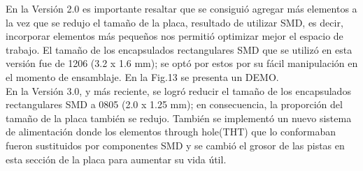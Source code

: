 \documentclass[times, 10pt,twocolumn]{article}
\begin{document}
En la Versión 2.0 es importante resaltar que se consiguió agregar más elementos a la vez que se redujo el tamaño de la placa, resultado de utilizar SMD, es decir, incorporar elementos más pequeños nos permitió optimizar mejor el espacio de trabajo. El tamaño de los encapsulados rectangulares SMD que se utilizó en esta versión fue de 1206 (3.2 x 1.6
mm); se optó por estos por su fácil manipulación en el momento de ensamblaje. En la Fig.13 se presenta un DEMO.\\

En la Versión 3.0, y más reciente, se logró reducir el tamaño de los encapsulados rectangulares SMD a 0805 (2.0 x 1.25 mm); en consecuencia, la proporción del tamaño de la placa también se redujo. También se implementó un nuevo sistema de alimentación donde los elementos through hole(THT) que lo conformaban fueron sustituidos por componentes SMD y se cambió el grosor de las pistas en esta sección de la placa para aumentar su vida útil.\\
\end{document}
